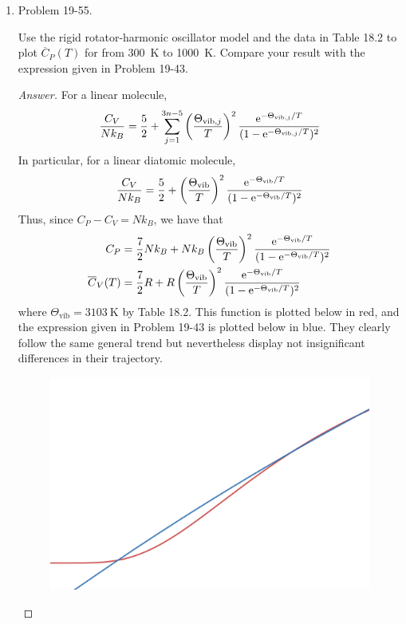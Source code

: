 \documentclass[../psets.tex]{subfiles}
\begin{document}
\begin{enumerate}
\begin{proof}[Answer]
        \begin{equation*}
            \boxed{\overline{S} = \SI{234.3}{\joule\per\mole\per\kelvin}}
        \end{equation*}
    \end{proof}
    \item Problem 19-55.\par
    Use the rigid rotator-harmonic oscillator model and the data in Table 18.2 to plot $\overline{C}_P(T)$ for  from \SI{300}{\kelvin} to \SI{1000}{\kelvin}. Compare your result with the expression given in Problem 19-43.
    \begin{proof}[Answer]
        For a linear molecule,
        \begin{equation*}
            \frac{C_V}{Nk_B} = \frac{5}{2}+\sum_{j=1}^{3n-5}\left( \frac{\Theta_{\text{vib},j}}{T} \right)^2\frac{\e[-\Theta_{\text{vib},j}/T]}{(1-\e[-\Theta_{\text{vib},j}/T])^2}
        \end{equation*}
        In particular, for a linear diatomic molecule,
        \begin{equation*}
            \frac{C_V}{Nk_B} = \frac{5}{2}+\left( \frac{\Theta_\text{vib}}{T} \right)^2\frac{\e[-\Theta_\text{vib}/T]}{(1-\e[-\Theta_\text{vib}/T])^2}
        \end{equation*}
        Thus, since $C_P-C_V=Nk_B$, we have that
        \begin{align*}
            C_P &= \frac{7}{2}Nk_B+Nk_B\left( \frac{\Theta_\text{vib}}{T} \right)^2\frac{\e[-\Theta_\text{vib}/T]}{(1-\e[-\Theta_\text{vib}/T])^2}\\
            \overline{C}_V(T) &= \frac{7}{2}R+R\left( \frac{\Theta_\text{vib}}{T} \right)^2\frac{\e[-\Theta_\text{vib}/T]}{(1-\e[-\Theta_\text{vib}/T])^2}
        \end{align*}
        where $\Theta_\text{vib}=\SI{3103}{\kelvin}$ by Table 18.2. This function is plotted below in red, and the expression given in Problem 19-43 is plotted below in blue. They clearly follow the same general trend but nevertheless display not insignificant differences in their trajectory.
        \begin{figure}[H]
            \centering
            \includegraphics[width=0.3\linewidth]{../../ExtFiles/pset2-8.png}

\end{figure}
\end{proof}
\end{enumerate}
\end{document}
